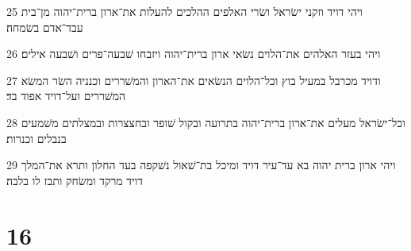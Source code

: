 \par 25 ויהי דויד וזקני ישׂראל ושׂרי האלפים ההלכים להעלות את־ארון ברית־יהוה מן־בית עבד־אדם בשׂמחה׃
\par 26 ויהי בעזר האלהים את־הלוים נשׂאי ארון ברית־יהוה ויזבחו שׁבעה־פרים ושׁבעה אילים׃
\par 27 ודויד מכרבל במעיל בוץ וכל־הלוים הנשׂאים את־הארון והמשׁררים וכנניה השׂר המשׂא המשׁררים ועל־דויד אפוד בד׃
\par 28 וכל־ישׂראל מעלים את־ארון ברית־יהוה בתרועה ובקול שׁופר ובחצצרות ובמצלתים משׁמעים בנבלים וכנרות׃
\par 29 ויהי ארון ברית יהוה בא עד־עיר דויד ומיכל בת־שׁאול נשׁקפה בעד החלון ותרא את־המלך דויד מרקד ומשׂחק ותבז לו בלבה׃

\chapter{16}


